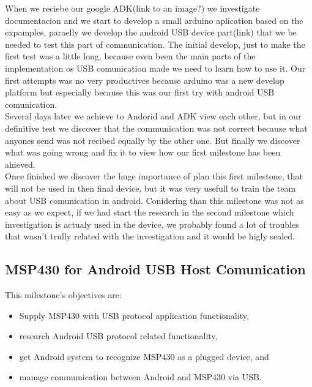 		
		 When we reciebe our google ADK(link to an image?) we investigate documentacion and we start to develop a small arduino aplication based on the expamples, paraelly we develop the android USB device part(link) that we be needed to test this part of  communication. The initial develop, just to make the first test was a little long, because even been the main parts of the implementation os USB comunication made we need to learn how to use it. Our first attempts was no very productives because arduino was a new develop platform but especially because this was our first try with android USB comunication. \\

		Several days later we achieve to Andorid and ADK view each other, but in our definitive test we discover that the communication was not correct because what anyones send was not recibed equally by the other one. But finally we discover what was going wrong and fix it to view how our first milestone has been ahieved.\\

		Once finished we discover the huge importance of plan this first milestone, that will not be used in then final device, but it was very usefull to train the team about USB comunication in android. Conidering than this milestone was not as easy as we expect, if we had start the research in the second milestone which investigation is actualy used in the device, we probably found a lot of troubles that wasn't trully related with the investigation and it would be higly sealed.\\


		\subsection{MSP430 for Android USB Host Comunication}

		This milestone's objectives are:
		\begin{itemize}
		\item Supply MSP430 with USB protocol application functionality,
		\item research Android USB protocol related functionality,
		\item get Android system to recognize MSP430 as a plugged device, and
		\item manage communication between Android and MSP430 via USB.
		\end{itemize}


